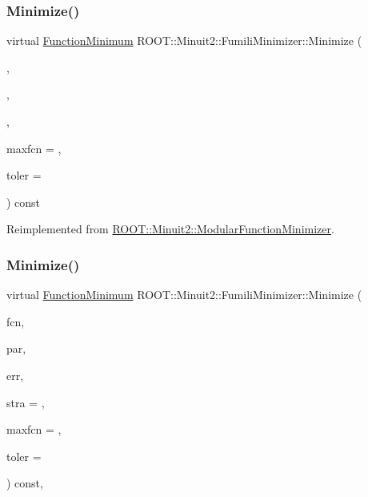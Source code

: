 \subsubsection{\texorpdfstring{Minimize()}{Minimize()}\hspace{0.1cm}{\footnotesize\ttfamily [4/22]}}
{\footnotesize\ttfamily virtual \mbox{\hyperlink{classROOT_1_1Minuit2_1_1FunctionMinimum}{Function\+Minimum}} R\+O\+O\+T\+::\+Minuit2\+::\+Fumili\+Minimizer\+::\+Minimize (\begin{DoxyParamCaption}\item[{const \mbox{\hyperlink{classROOT_1_1Minuit2_1_1FCNGradientBase}{F\+C\+N\+Gradient\+Base}} \&}]{,  }\item[{const \mbox{\hyperlink{classROOT_1_1Minuit2_1_1MnUserParameterState}{Mn\+User\+Parameter\+State}} \&}]{,  }\item[{const \mbox{\hyperlink{classROOT_1_1Minuit2_1_1MnStrategy}{Mn\+Strategy}} \&}]{,  }\item[{unsigned int}]{maxfcn = {},  }\item[{double}]{toler = {} }\end{DoxyParamCaption}) const\hspace{0.3cm}{\ttfamily [virtual]}}



Reimplemented from \mbox{\hyperlink{classROOT_1_1Minuit2_1_1ModularFunctionMinimizer_a2e1e21161544b931511204cdedac914d}{R\+O\+O\+T\+::\+Minuit2\+::\+Modular\+Function\+Minimizer}}.

\mbox{\label{classROOT_1_1Minuit2_1_1FumiliMinimizer_ab9ec6dd4a0e664db7d23a3ea3b0a3c75}} 
\subsubsection{\texorpdfstring{Minimize()}{Minimize()}\hspace{0.1cm}{\footnotesize\ttfamily [5/22]}}
{\footnotesize\ttfamily virtual \mbox{\hyperlink{classROOT_1_1Minuit2_1_1FunctionMinimum}{Function\+Minimum}} R\+O\+O\+T\+::\+Minuit2\+::\+Fumili\+Minimizer\+::\+Minimize (\begin{DoxyParamCaption}\item[{const \mbox{\hyperlink{classROOT_1_1Minuit2_1_1FCNBase}{F\+C\+N\+Base}} \&}]{fcn,  }\item[{const std\+::vector$<$ double $>$ \&}]{par,  }\item[{const std\+::vector$<$ double $>$ \&}]{err,  }\item[{unsigned int}]{stra = {},  }\item[{unsigned int}]{maxfcn = {},  }\item[{double}]{toler = {} }\end{DoxyParamCaption}) const\hspace{0.3cm}{\ttfamily [inline]}, {\ttfamily [virtual]}}



